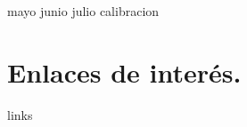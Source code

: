 \documentclass[11pt, oneside]{article}
\begin{document}


\tableofcontents
\clearpage
{mayo}
{junio}
{julio}
{calibracion}

\section{Enlaces de interés.}
    {links}
\end{document}
